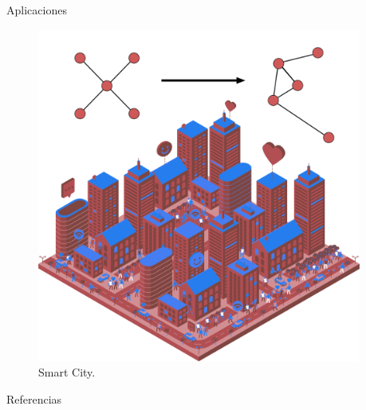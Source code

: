 \documentclass[final]{beamer}
\newlength{\sepwidthB}
\newlength{\colwidthB}
\newcommand{\separatorcolumnB}{\begin{column}{\sepwidthB}\end{column}}
\begin{document}
\begin{frame}[t]
\begin{columns}
\begin{column}[T]{\colwidthB}
\begin{block}{Aplicaciones}
        \begin{figure}[!Ht]
            \centering
                \includegraphics[width=\linewidth]{Figures/smart-city-app.png}
                \caption{Smart City.}
                \label{fig:app}
        \end{figure}
    \end{block}

  

    

\begin{block}{Referencias}

\nocite{*}

\end{block} 

\end{column}
\separatorcolumnB
\end{columns}
\end{frame}
\end{document}
